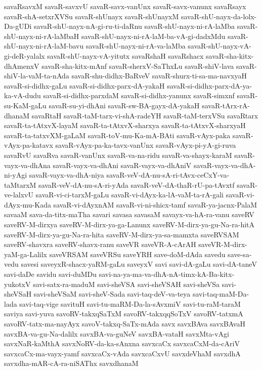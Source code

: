 {savaRsavxM
savaR-savxvU
savaR-savx-vanUnx
savaR-savx-vanunx
savaRsayx
savaR-shA-setxrXVSu
savaR-shUnayx
savaR-shUnayxM
savaR-shU-nayx-da-lolx-Da-gUDi
savaR-shU-nayx-nA-gi-ru-ti-daRnu
savaR-shU-nayx-ni-rA-laMba
savaR-shU-nayx-ni-rA-laMbaH
savaR-shU-nayx-ni-rA-laM-ba-vA-gi-dadxMdu
savaR-shU-nayx-ni-rA-laM-bavu
savaR-shU-nayx-ni-rA-va-laMba
savaR-shU-nayx-vA-gi-deR-yalalx
savaR-shU-nayx-vA-yitutx
savaRshaH
savaRshacx
savaR-sha-kitx-dhAmenxV
savaR-sha-kitx-mAnf
savaR-sherxV-SaThxLu
savaR-shiV-lava
savaR-shiV-la-vaM-ta-nAda
savaR-shu-didhx-BaRveV
savaR-shurx-ti-sa-ma-navxyaH
savaR-si-didhx-gaLu
savaR-si-didhx-parx-dA-yakaH
savaR-si-didhx-parx-dA-ya-ka-vA-dudu
savaR-si-didhx-parxdaM
savaR-si-didhx-yanunx
savaR-simxnf
savaR-su-KaM-gaLu
savaR-su-yi-dhAni
savaR-sw-BA-gayx-dA-yakaH
savaR-tArx-rA-dhanaM
savaRtaH
savaR-taM-tarx-vi-shA-radeYH
savaR-taM-terxVSu
savaRtarx
savaR-ta-tAtxvX-layaM
savaR-ta-tAtxvX-sharxya
savaR-ta-tAtxvX-sharxyaH
savaR-ta-tatxvXM-gaLaM
savaR-toV-mu-Ka-mA-BAti
savaR-vAyx-paka
savaR-vAyx-pa-katavx
savaR-vAyx-pa-ka-tavx-vanUnx
savaR-vAyx-pi-yA-gi-ruva
savaRvU
savaRva
savaR-vanUnx
savaR-va-na-ridu
savaR-va-shayx-karaM
savaR-vayx-va-dhAna
savaR-vayx-va-dhAni
savaR-vayx-va-dhAniV
savaR-vayx-va-dhA-ni-yAgi
savaR-vayx-va-dhA-niya
savaR-veV-dA-nu-sA-ri-tAvx-ceCxY-va-taMtarxM
savaR-veV-dA-nu-sA-ri-yAda
savaR-veV-dA-thaR-rU-pa-tAvxtf
savaR-ve-lalxvU
savaR-vi-ci-tarxM-gaLu
savaR-vi-dAyx-ka-lA-vaM-ta-rA-gali
savaR-vi-dAyx-mu-Kada
savaR-vi-dAyxnAM
savaR-vi-ni-shicx-tamf
savaR-ya-jacnx-PalaM
savaaM
sava-da-titx-maTha
savari
savasa
savasaM
savayx-va-hA-ra-vanu
saveRV
saveRV-M-dirxya
saveRV-M-dirx-ya-ga-Lanunx
saveRV-M-dirx-ya-gu-Na-ra-hitA
saveRV-M-dirx-ya-gu-Na-ra-hita
saveRV-M-dirx-ya-sa-mamxta
saveRVSAM
saveRV-shavxra
saveRV-shavx-ranu
saveVR
saveVR-A-cArAH
saveVR-M-dirx-yaM-ga-Lalilx
saveVRSAM
saveVRSu
saveYRH
save-doM-dAda
savedu
save-sa-vedu
savesi
saveyxR-shacx-yaRM-gaLu
saveyxV
savi
savi-dA-gaLu
savi-dA-taneV
savi-daDe
savidu
savi-duMDu
savi-na-ya-ma-va-dhA-nA-timx-kA-Ba-kitx-yukotxV
savi-satx-ra-maduM
savi-sheVSA
savi-sheVSAH
savi-sheVSa
savi-sheVSaH
savi-sheVSaM
savi-sheV-Sada
savi-taq-deV-va-teya
savi-taq-maM-Da-lada
savi-taq-vige
savituH
savi-tu-maRM-Da-la-sAvxmiV
savi-tu-raM-taraM
saviya
savi-yuva
savoRV-takxqSaTxM
savoRV-takxqqSoTxV
savoRV-tatxmA
savoRV-tatx-ma-nayAyx
savoV-takxq-SaTx-mAda
savx
savxBAva
savxBAvaH
savxBA-va-gu-Na-dalilx
savxBA-va-guNeV
savxBA-vataH
savxMta-vAgi
savxNaR-kaMthA
savxNoRV-da-ka-sAnxna
savxcaCx
savxcaCxM-da-cAriV
savxcaCx-ma-vayx-yamf
savxcaCx-vAda
savxcaCxvU
savxdeVhaM
savxdhA
savxdha-mAR-cA-ra-niSAThx
savxdhanaM
}
